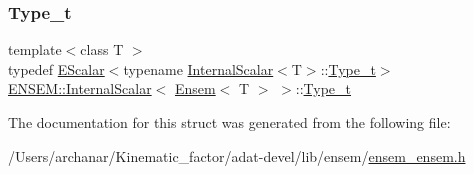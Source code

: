 \subsubsection{\texorpdfstring{Type\_t}{Type\_t}\hspace{0.1cm}{\footnotesize\ttfamily [3/3]}}
{\footnotesize\ttfamily template$<$class T $>$ \\
typedef \mbox{\hyperlink{classENSEM_1_1EScalar}{E\+Scalar}}$<$typename \mbox{\hyperlink{structENSEM_1_1InternalScalar}{Internal\+Scalar}}$<$T$>$\+::\mbox{\hyperlink{structENSEM_1_1InternalScalar_3_01Ensem_3_01T_01_4_01_4_ab389a1f835bfbbf4a47aefe1c076d832}{Type\+\_\+t}}$>$ \mbox{\hyperlink{structENSEM_1_1InternalScalar}{E\+N\+S\+E\+M\+::\+Internal\+Scalar}}$<$ \mbox{\hyperlink{classENSEM_1_1Ensem}{Ensem}}$<$ T $>$ $>$\+::\mbox{\hyperlink{structENSEM_1_1InternalScalar_3_01Ensem_3_01T_01_4_01_4_ab389a1f835bfbbf4a47aefe1c076d832}{Type\+\_\+t}}}



The documentation for this struct was generated from the following file\+:\begin{DoxyCompactItemize}
\item 
/\+Users/archanar/\+Kinematic\+\_\+factor/adat-\/devel/lib/ensem/\mbox{\hyperlink{adat-devel_2lib_2ensem_2ensem__ensem_8h}{ensem\+\_\+ensem.\+h}}\end{DoxyCompactItemize}
